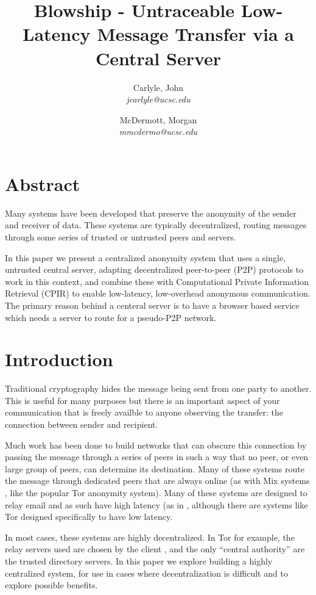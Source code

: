 \documentclass[twocolumn,11pt,english]{article}
\title{Blowship - Untraceable Low-Latency Message Transfer via a Central Server}
\date{}
\author{
  Carlyle, John\\
  \textit{jcarlyle@ucsc.edu}
  \and
  McDermott, Morgan\\
  \textit{mmcdermo@ucsc.edu}
}
\begin{document}
\maketitle

\section*{Abstract} 
Many systems have been developed that preserve the anonymity of the sender and receiver of data. These systems are typically decentralized, routing messages through some series of trusted or untrusted peers and servers. 

In this paper we present a centralized anonymity system that uses a single, untrusted central server, adapting decentralized peer-to-peer (P2P) protocols to work in this context, and combine these with Computational Private Information Retrieval (CPIR) to enable low-latency, low-overhead anonymous communication. The primary reason behind a centeral server is to have a browser based service which needs a server to route for a pseudo-P2P network.

\section{Introduction}

Traditional cryptography hides the message being sent from one party to another. This is useful for many purposes but there is an important aspect of your communication that is freely availble to anyone observing the transfer: the connection between sender and recipient. 

Much work has been done to build networks that can obscure this connection by passing the message through a series of peers in such a way that no peer, or even large group of peers, can determine its destination. Many of these systems route the message through dedicated peers that are always online (as with Mix systems \cite{chaum-mix}, like the popular Tor\cite{tor-design} anonymity system). Many of these systems are designed to relay email and as such have high latency (as in \cite{minion-design}, although there are systems like Tor designed specifically to have low latency. 

In most cases, these systems are highly decentralized. In Tor for example, the relay servers used are chosen by the client \cite{tor-design}, and the only ``central authority'' are the trusted directory servers. In this paper we explore building a highly centralized system, for use in cases where decentralization is difficult and to explore possible benefits. 
\end{document}
